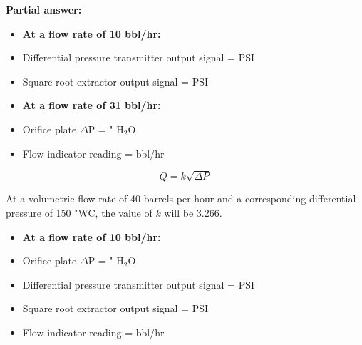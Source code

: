





\noindent
{\bf Partial answer:}

\begin{itemize}
\item {} {\bf At a flow rate of 10 bbl/hr:}
\vskip 5pt
\item{} Differential pressure transmitter output signal =  PSI
\vskip 5pt
\item{} Square root extractor output signal =  PSI
\end{itemize}

\vskip 10pt

\begin{itemize}
\item {} {\bf At a flow rate of 31 bbl/hr:}
\vskip 5pt
\item{} Orifice plate $\Delta$P =  " H$_{2}$O
\vskip 5pt
\item{} Flow indicator reading =  bbl/hr
\end{itemize}







$$Q = k \sqrt{\Delta P}$$

At a volumetric flow rate of 40 barrels per hour and a corresponding differential pressure of 150 "WC, the value of $k$ will be 3.266.

\begin{itemize}
\item {} {\bf At a flow rate of 10 bbl/hr:}
\vskip 5pt
\item{} Orifice plate $\Delta$P =  " H$_{2}$O
\vskip 5pt
\item{} Differential pressure transmitter output signal =  PSI
\vskip 5pt
\item{} Square root extractor output signal =  PSI
\vskip 5pt
\item{} Flow indicator reading =  bbl/hr
\end{itemize}

